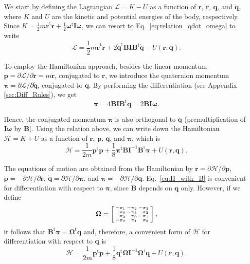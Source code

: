 \documentclass[aip,jcp,reprint,amsmath,amssymb]{revtex4-1}
\makeatletter
\newcommand{\mt}[1]{\boldsymbol{\mathbf{#1}}}           %
\newcommand{\vt}[1]{\boldsymbol{\mathbf{#1}}}           %
\newcommand{\tr}[1]{#1^\text{t}}                               %
\newenvironment{smallarray}[1]
{\null\,\vcenter\bgroup\scriptsize
	\renewcommand{\arraystretch}{0.7}
	\arraycolsep=.13885em
	\hbox\bgroup$\array{@{}#1@{}}}
{\endarray$\egroup\egroup\,\null}
\makeatother
\begin{document}
We start by defining the Lagrangian $\mathcal{L} = K - U$ as a function of $\vt r$, $\dot{\vt r}$, $\vt q$, and $\dot{\vt q}$, where $K$ and $U$ are the kinetic and potential energies of the body, respectively. Since $K = \frac{1}{2} m \tr{\dot{\vt r}} \dot{\vt r} + \frac{1}{2} \tr{\vt \omega} \mt I \vt \omega$,\cite{Goldstein2002} we can resort to Eq.~\ref{eq:relation_qdot_omega} to write
\[
\mathcal{L} = \frac{1}{2} m \tr{\dot{\vt r}} \dot{\vt r} + 2 \tr{\dot{\vt q}} \mt B \mt I \tr{\mt B} \dot{\vt q} - U(\vt r, \vt q).
\]

To employ the Hamiltonian approach, besides the linear momentum $\vt p = \partial \mathcal{L}/\partial \dot{\vt r} = m \dot{\vt r}$, conjugated to $\vt r$, we introduce the quaternion momentum $\vt \pi = \partial \mathcal{L}/\partial \dot{\vt q}$, conjugated to $\vt q$.\citep{Goldstein2002} By performing the differentiation (see Appendix \ref{sec:Diff_Rules}), we get
\begin{equation}
\label{eq:conj_momentum}
\vt \pi = 4 \mt B \mt I \tr{\mt B} \dot{\vt q} = 2 \mt B \mt I \vt \omega.
\end{equation}

Hence, the conjugated momentum $\vt \pi$ is also orthogonal to $\vt q$ (premultiplication of $\mt I \vt \omega$ by $\mt B$). Using the relation above, we can write down the Hamiltonian $\mathcal{H} = K + U$ as a function of $\vt r$, $\vt p$, $\vt q$, and $\vt \pi$, which is
\begin{equation}
\label{eq:H_with_B}
\mathcal{H} = \frac{1}{2m} \tr{\vt p} \vt p + \frac{1}{8} \tr{\vt \pi} {\mt B} {\mt I}^{-1} \tr{\mt B} \vt \pi + U(\vt r, \vt q).
\end{equation}

The equations of motion are obtained from the Hamiltonian by $\dot{\vt r} = \partial \mathcal{H} / \partial \vt p$, $\dot{\vt p} = -\partial \mathcal{H} / \partial \vt r$, $\dot{\vt q} = \partial \mathcal{H} / \partial \vt \pi$, and $\dot{\vt \pi} = -\partial \mathcal{H} / \partial \vt q$.\cite{Goldstein2002} Eq.~\ref{eq:H_with_B} is convenient for differentiation with respect to $\vt \pi$, since $\mt B$ depends on $\vt q$ only. However, if we define
\[
\mt \Omega = \left[
\begin{smallarray}{rrrr}
-\pi_1 & -\pi_2 & -\pi_3 \\
 \pi_0 & -\pi_3 &  \pi_2 \\
 \pi_3 &  \pi_0 & -\pi_1 \\
-\pi_2 &  \pi_1 &  \pi_0
\end{smallarray}
\right],
\]
it follows that $\tr{\mt B}{\vt \pi} = \tr{\mt \Omega}{\vt q}$ and, therefore, a convenient form of $\mathcal{H}$ for differentiation with respect to $\vt q$ is
\begin{equation}
\label{eq:H_with_Omega}
\mathcal{H} = \frac{1}{2m} \tr{\vt p} \vt p + \frac{1}{8} \tr{\vt q} {\mt \Omega} {\mt I}^{-1} \tr{\mt \Omega} \vt q + U(\vt r, \vt q).
\end{equation}
\end{document}
